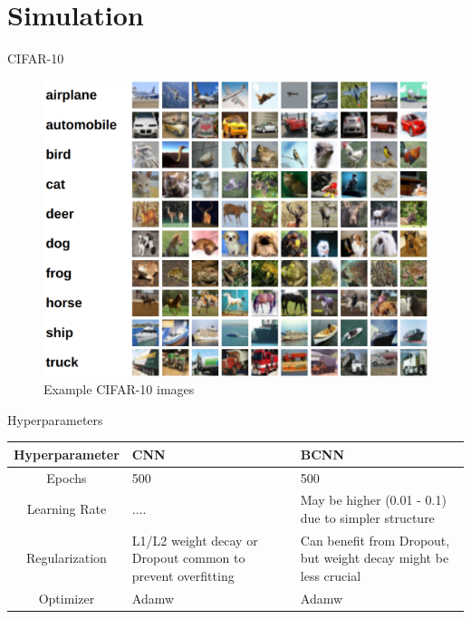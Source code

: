 \documentclass{beamer}
\begin{document}
\section{Simulation}

\begin{frame}{CIFAR-10}
	\begin{figure}
		\includegraphics[width=.65\textwidth]{../Images/cifar-10.png}
		\caption{Example CIFAR-10 images \cite{cifar10}}
	\end{figure}
\end{frame}

\begin{frame}{Hyperparameters}
	\centering
	\begin{tabular}{|c||p{3cm}|p{3cm}|} %
		\hline
		\textbf{Hyperparameter} & \textbf{CNN} & \textbf{BCNN} \\ [0.5ex] 
		\hline\hline
		Epochs & 500 & 500\\
		\hline
		Learning Rate & ....  & May be higher (0.01 - 0.1) due to simpler structure  \\
		\hline
		Regularization & L1/L2 weight decay or Dropout common to prevent overfitting & Can benefit from Dropout, but weight decay might be less crucial \\
		\hline
		Optimizer & Adamw  & Adamw  \\
		\hline
	\end{tabular}
\end{frame}
\end{document}
